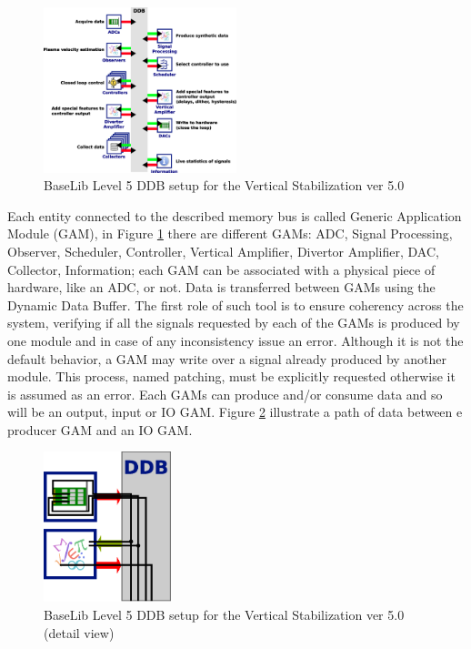 \begin{figure}[h!]
 \begin{center}
  \includegraphics[width=0.5\textwidth]{images/VS5-GAMs2.eps}
  \caption{BaseLib Level 5 DDB setup for the Vertical Stabilization ver 5.0}
  \label{f:level5:DDB:VS5}
 \end{center}
\end{figure}

Each entity connected to the described memory bus is called Generic Application Module (GAM), in Figure \ref{f:level5:DDB:VS5} there are different GAMs: ADC, Signal Processing, Observer, Scheduler, Controller, Vertical Amplifier, Divertor Amplifier, DAC, Collector, Information; each GAM can be associated with a physical piece of hardware, like an ADC, or not.
Data is transferred between GAMs using the Dynamic Data Buffer. The first role of such tool is to ensure coherency across the system, verifying if all the signals requested by each of the GAMs is produced by one module and in case of any inconsistency issue an error. Although it is not the default behavior, a GAM may write over a signal already produced by another module. This process, named patching, must be explicitly requested otherwise it is assumed as an error.
Each GAMs can produce and/or consume data and so will be an output, input or IO GAM. Figure \ref{f:level5:DDB:VS5detail} illustrate a path of data between e producer GAM and an IO GAM. \\

\begin{figure}[h!]
 \begin{center}
  \includegraphics[width=0.33\textwidth]{images/DDBDetail.eps}
  \caption{BaseLib Level 5 DDB setup for the Vertical Stabilization ver 5.0 (detail view)}
  \label{f:level5:DDB:VS5detail}
 \end{center}
\end{figure}

